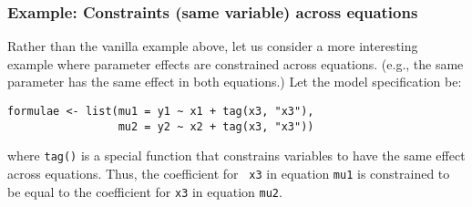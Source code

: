 \documentclass[oneside,letterpaper,12pt]{article}
\begin{document}
\subsubsection{Example: Constraints (same variable) across equations}

Rather than the vanilla example above, let us consider a more
interesting example where parameter effects are constrained across
equations.  (e.g., the same parameter has the same effect in both
equations.)  Let the model specification be:  
\begin{verbatim}
formulae <- list(mu1 = y1 ~ x1 + tag(x3, "x3"), 
                 mu2 = y2 ~ x2 + tag(x3, "x3"))
\end{verbatim}
where {\tt tag()} is a special function that constrains variables to
have the same effect across equations.  Thus, the coefficient for {\tt
x3} in equation {\tt mu1} is constrained to be equal to the
coefficient for {\tt x3} in equation {\tt mu2}.  
\end{document}
